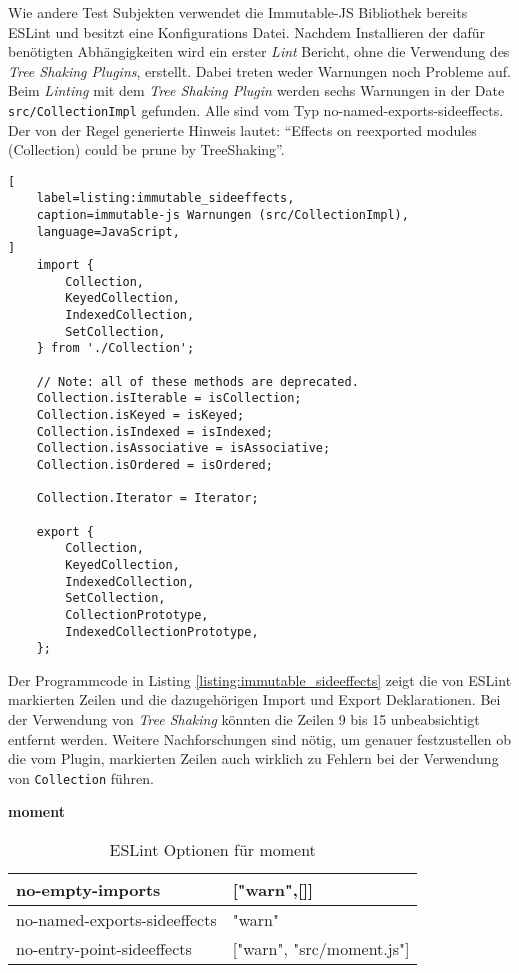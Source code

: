 Wie andere Test Subjekten verwendet die Immutable-JS Bibliothek bereits ESLint und besitzt eine Konfigurations Datei. Nachdem Installieren der dafür benötigten Abhängigkeiten wird ein erster \textit{Lint} Bericht, ohne die Verwendung des \textit{Tree Shaking Plugins}, erstellt. Dabei treten weder Warnungen noch Probleme auf. Beim \textit{Linting} mit dem \textit{Tree Shaking Plugin} werden sechs Warnungen in der Date \lstinline{src/CollectionImpl} gefunden. Alle sind vom Typ no-named-exports-sideeffects. Der von der Regel generierte Hinweis lautet: ``Effects on reexported modules (Collection) could be prune by TreeShaking''.

\begin{lstlisting}[
    label=listing:immutable_sideeffects,
	caption=immutable-js Warnungen (src/CollectionImpl),
	language=JavaScript,
]
	import {
		Collection,
		KeyedCollection,
		IndexedCollection,
		SetCollection,
	} from './Collection';

	// Note: all of these methods are deprecated.
	Collection.isIterable = isCollection;
	Collection.isKeyed = isKeyed;
	Collection.isIndexed = isIndexed;
	Collection.isAssociative = isAssociative;
	Collection.isOrdered = isOrdered;

	Collection.Iterator = Iterator;
	
	export {
  		Collection,
  		KeyedCollection,
  		IndexedCollection,
  		SetCollection,
  		CollectionPrototype,
  		IndexedCollectionPrototype,
	};
\end{lstlisting}

Der Programmcode in Listing \ref{listing:immutable_sideeffects} zeigt die von ESLint markierten Zeilen und die dazugehörigen Import und Export Deklarationen. Bei der Verwendung von \textit{Tree Shaking} könnten die Zeilen 9 bis 15 unbeabsichtigt entfernt werden. Weitere Nachforschungen sind nötig,
 um genauer festzustellen ob die vom Plugin, markierten Zeilen auch wirklich zu Fehlern bei der Verwendung von \lstinline{Collection} führen. 

\textbf{moment}
\begin{table}[H]
\centering
\caption{ESLint Optionen für moment}
\label{tbl:moment-options}
\begin{tabular}{|l|l|}
\hline
no-empty-imports             & {[}"warn",{[}{]}{]}         \\ \hline
no-named-exports-sideeffects & "warn"                      \\ \hline
no-entry-point-sideeffects   & {[}"warn", "src/moment.js"{]} \\ \hline
\end{tabular}
\end{table}

